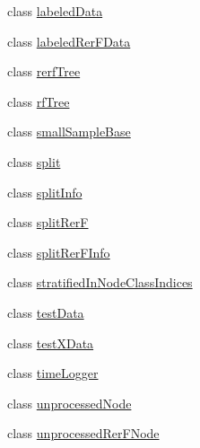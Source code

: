 \begin{DoxyCompactItemize}
class \hyperlink{classfp_1_1labeledData}{labeled\+Data}
\item 
class \hyperlink{classfp_1_1labeledRerFData}{labeled\+Rer\+F\+Data}
\item 
class \hyperlink{classfp_1_1rerfTree}{rerf\+Tree}
\item 
class \hyperlink{classfp_1_1rfTree}{rf\+Tree}
\item 
class \hyperlink{classfp_1_1smallSampleBase}{small\+Sample\+Base}
\item 
class \hyperlink{classfp_1_1split}{split}
\item 
class \hyperlink{classfp_1_1splitInfo}{split\+Info}
\item 
class \hyperlink{classfp_1_1splitRerF}{split\+RerF}
\item 
class \hyperlink{classfp_1_1splitRerFInfo}{split\+Rer\+F\+Info}
\item 
class \hyperlink{classfp_1_1stratifiedInNodeClassIndices}{stratified\+In\+Node\+Class\+Indices}
\item 
class \hyperlink{classfp_1_1testData}{test\+Data}
\item 
class \hyperlink{classfp_1_1testXData}{test\+X\+Data}
\item 
class \hyperlink{classfp_1_1timeLogger}{time\+Logger}
\item 
class \hyperlink{classfp_1_1unprocessedNode}{unprocessed\+Node}
\item 
class \hyperlink{classfp_1_1unprocessedRerFNode}{unprocessed\+Rer\+F\+Node}
\end{DoxyCompactItemize}
